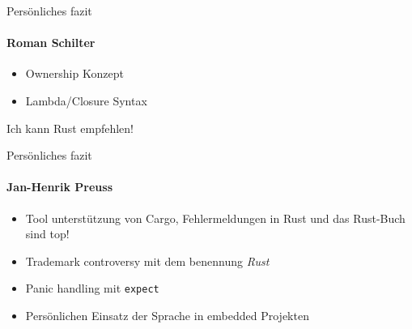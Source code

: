 \begin{frame}{Persönliches fazit}
    \framesubtitle{Roman Schilter}

    \begin{itemize}
        \item Ownership Konzept \pause
        \item Lambda/Closure Syntax \pause
    \end{itemize}

    \pause
    Ich kann Rust empfehlen!



\end{frame}

\begin{frame}{Persönliches fazit}
    \framesubtitle{Jan-Henrik Preuss}
    \begin{itemize}
        \item Tool unterstützung von Cargo, Fehlermeldungen in Rust und das Rust-Buch sind top! \pause
        \item Trademark controversy mit dem benennung \textit{Rust} \pause
        \item Panic handling mit \texttt{expect} \pause
        \item Persönlichen Einsatz der Sprache in embedded Projekten
    \end{itemize}
\end{frame}
